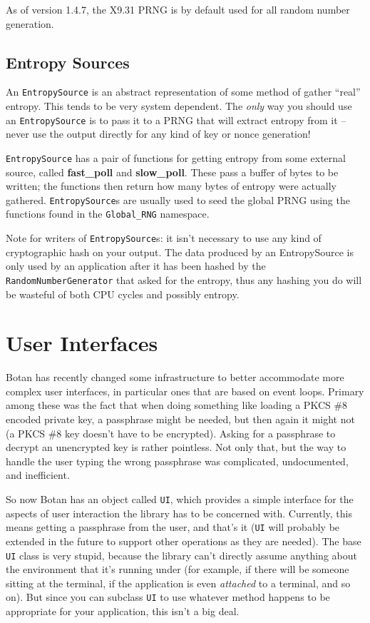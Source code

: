 \documentclass{article}
\newcommand{\function}[1]{\textbf{#1}}
\newcommand{\type}[1]{\texttt{#1}}
\newcommand{\namespace}[1]{\texttt{#1}}
\begin{document}
As of version 1.4.7, the X9.31 PRNG is by default used for all random number
generation.

\subsection{Entropy Sources}

An \type{EntropySource} is an abstract representation of some method of gather
``real'' entropy. This tends to be very system dependent. The \emph{only} way
you should use an \type{EntropySource} is to pass it to a PRNG that will
extract entropy from it -- never use the output directly for any kind of key or
nonce generation!

\type{EntropySource} has a pair of functions for getting entropy from some
external source, called \function{fast\_poll} and \function{slow\_poll}. These
pass a buffer of bytes to be written; the functions then return how many bytes
of entropy were actually gathered. \type{EntropySource}s are usually used to
seed the global PRNG using the functions found in the \namespace{Global\_RNG}
namespace.

Note for writers of \type{EntropySource}s: it isn't necessary to use any kind
of cryptographic hash on your output. The data produced by an EntropySource is
only used by an application after it has been hashed by the
\type{RandomNumberGenerator} that asked for the entropy, thus any hashing
you do will be wasteful of both CPU cycles and possibly entropy.

\pagebreak
\section{User Interfaces}

Botan has recently changed some infrastructure to better accommodate more
complex user interfaces, in particular ones that are based on event
loops. Primary among these was the fact that when doing something like loading
a PKCS \#8 encoded private key, a passphrase might be needed, but then again it
might not (a PKCS \#8 key doesn't have to be encrypted). Asking for a
passphrase to decrypt an unencrypted key is rather pointless. Not only that,
but the way to handle the user typing the wrong passphrase was complicated,
undocumented, and inefficient.

So now Botan has an object called \type{UI}, which provides a simple interface
for the aspects of user interaction the library has to be concerned
with. Currently, this means getting a passphrase from the user, and that's it
(\type{UI} will probably be extended in the future to support other operations
as they are needed). The base \type{UI} class is very stupid, because the
library can't directly assume anything about the environment that it's running
under (for example, if there will be someone sitting at the terminal, if the
application is even \emph{attached} to a terminal, and so on). But since you
can subclass \type{UI} to use whatever method happens to be appropriate for
your application, this isn't a big deal.
\end{document}

